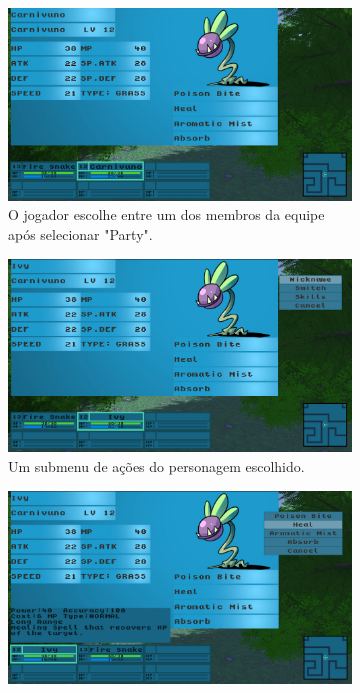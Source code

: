 \documentclass[
	12pt,				%
	openright,			%
	twoside,			%
	a4paper,			%
	english,			%
	french,				%
	spanish,			%
	brazil				%
	]{abntex2}
\begin{document}
\begin{figure}[h!]
  \centering
  \begin{subfigure}[b]{0.45\linewidth}
    \includegraphics[width=\linewidth]{status.jpg}
     \caption{O jogador escolhe entre um dos membros da equipe após selecionar "Party".}
  \end{subfigure}
  \begin{subfigure}[b]{0.45\linewidth}
    \includegraphics[width=\linewidth]{nickname.jpg}
    \caption{Um submenu de ações do personagem escolhido.}
  \end{subfigure}
  \begin{subfigure}[b]{0.45\linewidth}
    \includegraphics[width=\linewidth]{skills.jpg}

\end{subfigure}
\end{figure}
\end{document}
